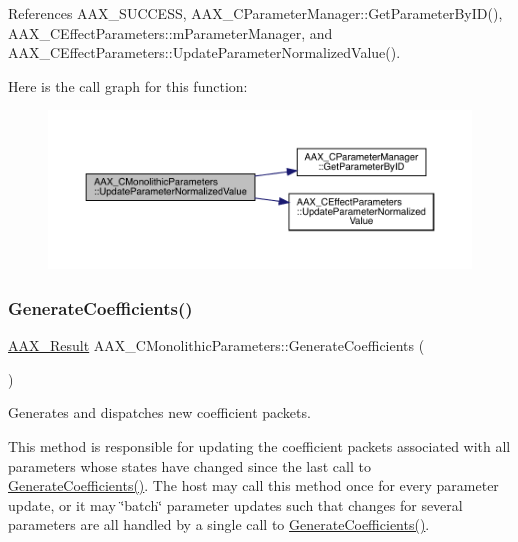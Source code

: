 References A\+A\+X\+\_\+\+S\+U\+C\+C\+E\+SS, A\+A\+X\+\_\+\+C\+Parameter\+Manager\+::\+Get\+Parameter\+By\+I\+D(), A\+A\+X\+\_\+\+C\+Effect\+Parameters\+::m\+Parameter\+Manager, and A\+A\+X\+\_\+\+C\+Effect\+Parameters\+::\+Update\+Parameter\+Normalized\+Value().

Here is the call graph for this function\+:
\nopagebreak
\begin{figure}[H]
\begin{center}
\leavevmode
\includegraphics[width=350pt]{a01969_a9ef4fd6fa467008fcea4455d19c08009_cgraph}
\end{center}
\end{figure}
\mbox{\label{a01969_a626cb2aaa68c64238298acfd6db448f5}} 
\subsubsection{\texorpdfstring{GenerateCoefficients()}{GenerateCoefficients()}}
{\footnotesize\ttfamily \mbox{\hyperlink{a00392_a4d8f69a697df7f70c3a8e9b8ee130d2f}{A\+A\+X\+\_\+\+Result}} A\+A\+X\+\_\+\+C\+Monolithic\+Parameters\+::\+Generate\+Coefficients (\begin{DoxyParamCaption}{ }\end{DoxyParamCaption})\hspace{0.3cm}{\ttfamily [virtual]}}



Generates and dispatches new coefficient packets. 

This method is responsible for updating the coefficient packets associated with all parameters whose states have changed since the last call to \mbox{\hyperlink{a01669_a083265b008921b6114ede387711694b7}{Generate\+Coefficients()}}. The host may call this method once for every parameter update, or it may \char`\"{}batch\char`\"{} parameter updates such that changes for several parameters are all handled by a single call to \mbox{\hyperlink{a01669_a083265b008921b6114ede387711694b7}{Generate\+Coefficients()}}.

